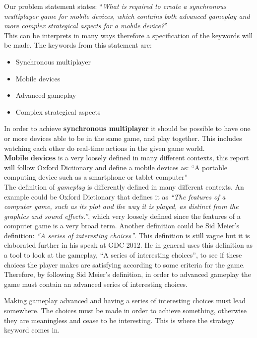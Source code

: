 Our problem statement states: ``\textit{What is required to create a synchronous multiplayer game for mobile devices, which contains both advanced
gameplay and more complex strategical aspects for a mobile device?}''\\
This can be interprets in many ways therefore a specification of the keywords will be made.
The keywords from this statement are:
\begin{itemize}
\item Synchronous multiplayer
\item Mobile devices
\item Advanced gameplay
\item Complex strategical aspects
\end{itemize}
In order to achieve \textbf{synchronous multiplayer} it should be possible to have one or more devices able to be in the same game, and play together. This includes watching each other do real-time actions in the given game world.\\
\textbf{Mobile devices} is a very loosely defined in many different contexts, this report will follow Oxford Dictionary and define a mobile devices as: ``A portable computing device such as a smartphone or tablet computer''\cite{mobileOx}\\
The definition of \textit{gameplay} is differently defined in many different contexts. An example could be Oxford Dictionary that defines it as \textit{``The features of a computer game, such as its plot and the way it is played, as distinct from the graphics and sound effects.''}\cite{gameplayOx}, which very loosely defined since the features of a computer game is a very broad term. Another definition could be Sid Meier's definition: \textit{``A series of interesting choices''}\cite{GDC2012}. This definition is still vague but it is elaborated further in his speak at GDC 2012.\cite{GDC2012}
He in general uses this definition as a tool to look at the gameplay, ``A series of interesting choices'', to see if these choices the player makes are satisfying according to some criteria for the game.\\
Therefore, by following Sid Meier's definition, in order to advanced gameplay the game must contain an advanced series of interesting choices.

Making gameplay advanced and having a series of interesting choices must lead somewhere.
The choices must be made in order to achieve something, otherwise they are meaningless and cease to be interesting.
This is where the strategy keyword comes in.\\

